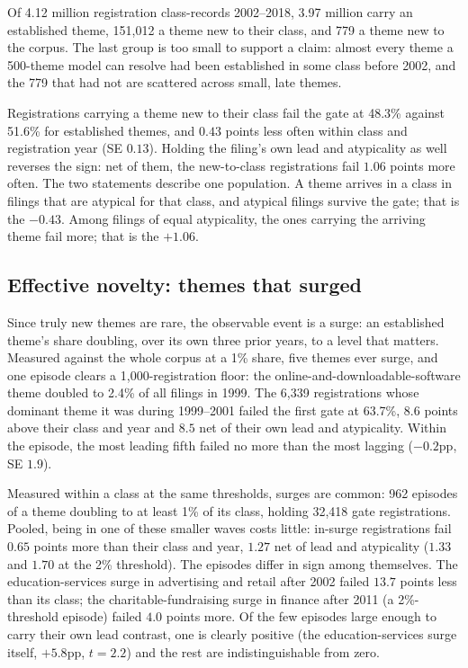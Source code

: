 Of 4.12 million registration class-records 2002--2018, 3.97 million carry
an established theme, 151{,}012 a theme new to their class, and 779 a theme
new to the corpus. The last group is too small to support a claim: almost
every theme a 500-theme model can resolve had been established in some class
before 2002, and the 779 that had not are scattered across small, late
themes.

Registrations carrying a theme new to their class fail the gate at 48.3\%
against 51.6\% for established themes, and $0.43$ points less often within
class and registration year (SE $0.13$). Holding the filing's own lead and
atypicality as well reverses the sign: net of them, the new-to-class
registrations fail $1.06$ points more often. The two statements describe
one population. A theme arrives in a class in filings that are atypical for
that class, and atypical filings survive the gate; that is the $-0.43$.
Among filings of equal atypicality, the ones carrying the arriving theme
fail more; that is the $+1.06$.

\subsection{Effective novelty: themes that surged}\label{sec:surge}

Since truly new themes are rare, the observable event is a surge: an
established theme's share doubling, over its own three prior years, to a
level that matters. Measured against the whole corpus at a 1\% share, five
themes ever surge, and one episode clears a 1{,}000-registration floor: the
online-and-downloadable-software theme doubled to 2.4\% of all filings in
1999. The 6{,}339 registrations whose dominant theme it was during
1999--2001 failed the first gate at 63.7\%, $8.6$ points above their class
and year and $8.5$ net of their own lead and atypicality. Within the
episode, the most leading fifth failed no more than the most lagging
($-0.2$pp, SE $1.9$).

Measured within a class at the same thresholds, surges are common: 962
episodes of a theme doubling to at least 1\% of its class, holding 32{,}418
gate registrations. Pooled, being in one of these smaller waves costs
little: in-surge registrations fail $0.65$ points more than their class and
year, $1.27$ net of lead and atypicality ($1.33$ and $1.70$ at the 2\%
threshold). The episodes differ in sign among themselves. The
education-services surge in advertising and retail after 2002 failed
$13.7$ points less than its class; the charitable-fundraising surge
in finance after 2011 (a 2\%-threshold episode) failed $4.0$ points more. Of the few episodes
large enough to carry their own lead contrast, one is clearly positive
(the education-services surge itself, $+5.8$pp, $t = 2.2$) and the rest
are indistinguishable from zero.

